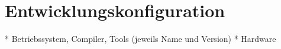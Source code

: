 \section{Entwicklungskonfiguration}
\label{sec:programmierhandbuch:konfig}

    * Betriebssystem, Compiler, Tools (jeweils Name und Version)
    * Hardware 
